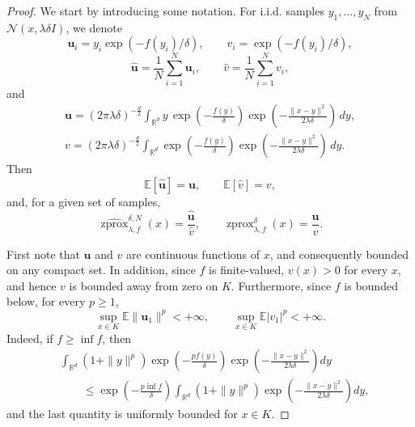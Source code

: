 \documentclass[10pt,a4paper]{amsart}
\newcommand{\szprox}{\ensuremath{\widehat{\operatorname{zprox}}}}
\newcommand{\zprox}{\ensuremath{\operatorname{zprox}}}
\begin{document}
\begin{proof}
We start by introducing some notation. For i.i.d. samples
\(y_1,\ldots,y_N\) from \(\mathcal{N}(x,\lambda \delta I)\), we denote
\[
    \mathbf u_i
    =
    y_i\exp(-f(y_i)/\delta),
    \qquad
    v_i
    =
    \exp(-f(y_i)/\delta),
\]
\[
    \hat{\mathbf u}
    =
    \frac{1}{N}\sum_{i=1}^N\mathbf u_i,
    \qquad
    \hat v
    =
    \frac{1}{N}\sum_{i=1}^Nv_i,
\]
and
\[
\begin{gathered}
\mathbf u
=
(2\pi\lambda\delta)^{-\frac{d}{2}}
\int_{\mathbb{R}^d}
y\,
\exp\!\left(-\frac{f(y)}{\delta}\right)
\exp\!\left(-\frac{\|x-y\|^2}{2\lambda\delta}\right)\,dy,
\\
v
=
(2\pi\lambda\delta)^{-\frac{d}{2}}
\int_{\mathbb{R}^d}
\exp\!\left(-\frac{f(y)}{\delta}\right)
\exp\!\left(-\frac{\|x-y\|^2}{2\lambda\delta}\right)\,dy.
\end{gathered}
\]
Then
\[
    \mathbb{E}[\hat{\mathbf u}]=\mathbf u,
    \qquad
    \mathbb{E}[\hat v]=v,
\]
and, for a given set of samples,
\[
    \szprox^{\delta,N}_{\lambda, f}(x)
    =
    \frac{\hat{\mathbf u}}{\hat v},
    \qquad
    \zprox^{\delta}_{\lambda, f}(x)
    =
    \frac{\mathbf u}{v}.
\]

First note that \(\mathbf u\) and \(v\) are continuous functions of \(x\), and consequently bounded on any compact set. In addition, since \(f\) is finite-valued, \(v(x)>0\) for every \(x\), and hence \(v\) is bounded away from zero on \(K\). Furthermore, since \(f\) is bounded below, for every \(p\ge 1\),
\[
\sup_{x\in K}\mathbb{E}\|\mathbf u_1\|^p<+\infty,
\qquad
\sup_{x\in K}\mathbb{E}|v_1|^p<+\infty .
\]
Indeed, if \(f\ge \inf f\), then
\[
\begin{aligned}
&\int_{\mathbb{R}^d}(1+\|y\|^p)
\exp\left(-\frac{p f(y)}{\delta}\right)
\exp\!\left(-\frac{\|x-y\|^2}{2\lambda\delta}\right)dy \\
&\qquad\le
\exp\left(-\frac{p\inf f}{\delta}\right)
\int_{\mathbb{R}^d}(1+\|y\|^p)
\exp\!\left(-\frac{\|x-y\|^2}{2\lambda\delta}\right)dy,
\end{aligned}
\]
and the last quantity is uniformly bounded for \(x\in K\).


\end{proof}
\end{document}
